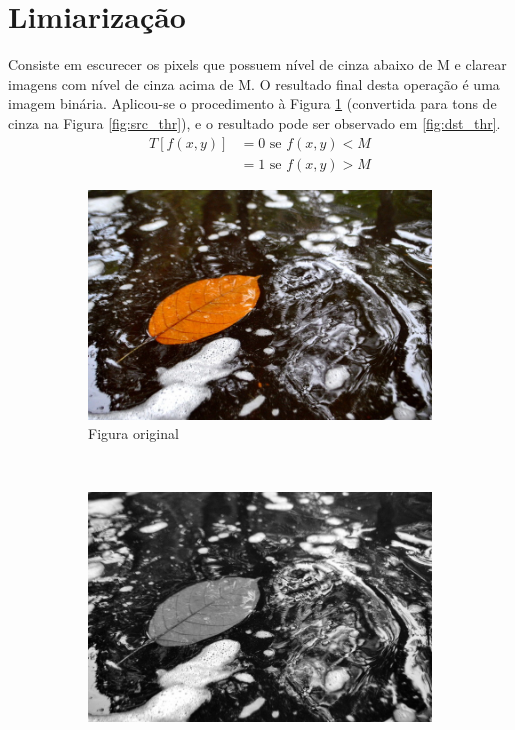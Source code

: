 \documentclass[10pt,a4paper]{article}
\begin{document}
\section{Limiarização}
Consiste em escurecer os pixels que possuem nível de cinza abaixo de M e clarear imagens com nível de cinza acima de M. O resultado final desta operação é uma imagem binária. Aplicou-se o procedimento à Figura \ref{fig:original2} (convertida para tons de cinza na Figura \ref{fig:src_thr}), e o resultado pode ser observado em \ref{fig:dst_thr}.
\begin{align*}
    T[f(x,y)] &= 0 \text{ se } f(x,y) < M \\
              &= 1 \text{ se } f(x,y) > M
\end{align*}

\begin{figure}[!ht]
    \centering
    \begin{subfigure}[ht]{0.45\textwidth}
        \includegraphics[width=\textwidth]{original2.jpg}
        \caption{Figura original}
        \label{fig:original2}
    \end{subfigure}
    \\
    \begin{subfigure}[ht]{0.45\textwidth}
        \includegraphics[width=\textwidth]{src_thr.jpg}

\end{subfigure}
\end{figure}
\end{document}
